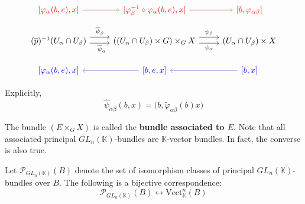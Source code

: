 \documentclass[11pt,a4paper]{article}
\begin{document}
\begin{enumerate}[(i)]
\[\begin{tikzcd}
	{\color{red}[\varphi_{\alpha}(b,e),x]} & {\color{red}[\varphi_{\beta}^{-1}\circ \varphi_{\alpha}(b, e), x]} & {\color{red}[b,\varphi_{\alpha\beta}]} \\
	{(\overline{p})^{-1}(U_{\alpha}\cap U_{\beta})} & {((U_{\alpha}\cap U_{\beta})\times G) \times_G X} & {(U_{\alpha}\cap U_{\beta})\times X} \\
	{\color{blue}[\varphi_{\alpha}(b,e),x]} & {\color{blue}[b,e,x]} & {\color{blue}[b,x]}
	\arrow["{\overline{\psi}_{\alpha}}"'{pos=0.6}, shift right=1, from=2-1, to=2-2]
	\arrow["{\psi_{\beta}}", shift left=2, from=2-2, to=2-3]
	\arrow["{\psi_{\alpha}}"', shift right=1, from=2-2, to=2-3]
	\arrow["{\overline{\psi}_{\beta}}", shift left=2, from=2-1, to=2-2]
	\arrow[color={rgb,255:red,92;green,92;blue,214}, from=3-2, to=3-1]
	\arrow[color={rgb,255:red,92;green,92;blue,214}, from=3-3, to=3-2]
	\arrow[color={rgb,255:red,214;green,92;blue,92}, from=1-1, to=1-2]
	\arrow[color={rgb,255:red,214;green,92;blue,92}, from=1-2, to=1-3]
\end{tikzcd}\]


Explicitly,
$$\widehat{\psi}_{\alpha\beta}(b, x) = \big(b, \widetilde\varphi_{\alpha\beta}(b)x\big)$$
\end{enumerate}

The bundle $(E\times_G X)$ is called the \textbf{bundle associated to $E$}. Note that all associated principal $GL_n(\mathbb{K})$-bundles are $\mathbb{K}$-vector bundles. In fact, the converse is also true.

\begin{theorem}
    Let $\mathcal{P}_{GL_n(\mathbb{K})}(B)$ denote the set of isomorphism classes of principal $GL_n(\mathbb{K})$-bundles over $B$. The following is a bijective correspondence:
    $$\mathcal{P}_{GL_n(\mathbb{K})}(B) \longleftrightarrow \text{Vect}_{\mathbb{K}}^n(B)$$
\end{theorem}
\end{document}
